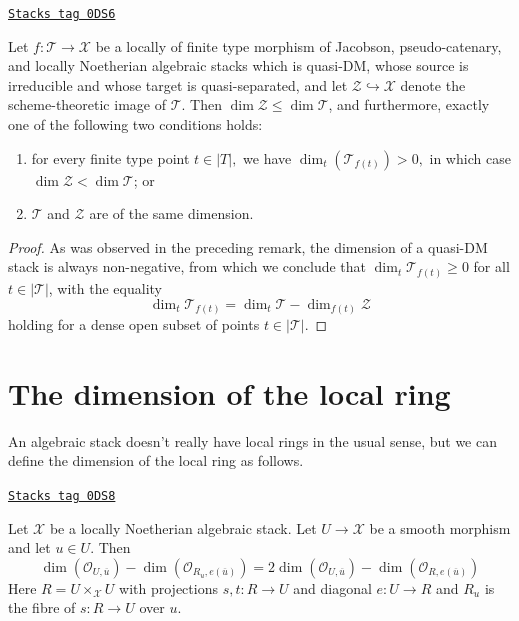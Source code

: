 \begin{lemma}
\label{stacks-geometry-lemma-dims-of-images-two}
\href{https://stacks.math.columbia.edu/tag/0DS6}{\texttt{Stacks tag 0DS6}}

Let $f: \mathcal{T} \to \mathcal{X}$ be a locally of finite type
morphism of Jacobson, pseudo-catenary, and locally Noetherian
algebraic stacks
which is quasi-DM,
whose source is irreducible and whose target is quasi-separated,
and let $\mathcal{Z} \hookrightarrow \mathcal{X}$ denote the scheme-theoretic
image of $\mathcal{T}$.
Then $\dim \mathcal{Z} \leq \dim \mathcal{T}$,
and furthermore, exactly one of the following two conditions holds:
\begin{enumerate}
\item for every finite type point $t \in |T|,$
we have
$\dim_t(\mathcal{T}_{f(t)}) > 0,$ in which
case $\dim \mathcal{Z} < \dim \mathcal{T}$; or
\item   $\mathcal{T}$ and $\mathcal{Z}$
are of the same dimension.
\end{enumerate}
\end{lemma}

\begin{proof}
As was observed in the preceding remark,
the dimension of a quasi-DM stack is always non-negative,
from which we conclude that $\dim_t \mathcal{T}_{f(t)} \geq 0$
for all $t \in |\mathcal{T}|$, with the equality
$$
\dim_t \mathcal{T}_{f(t)} = \dim_t \mathcal{T} - \dim_{f(t)} \mathcal{Z}
$$
holding
for a dense open subset of points $t\in |\mathcal{T}|$.
\end{proof}

\section{The dimension of the local ring}
\label{stacks-geometry-section-dimension-local-ring}
An algebraic stack doesn't really have local rings in the usual sense,
but we can define the dimension of the local ring as follows.

\begin{lemma}
\label{stacks-geometry-lemma-dimension-local-ring-pre}
\href{https://stacks.math.columbia.edu/tag/0DS8}{\texttt{Stacks tag 0DS8}}

Let $\mathcal{X}$ be a locally Noetherian algebraic stack.
Let $U \to \mathcal{X}$ be a smooth morphism and let $u \in U$.
Then
$$
\dim(\mathcal{O}_{U, \overline{u}}) -
\dim(\mathcal{O}_{R_u, e(\overline{u})}) =
2\dim(\mathcal{O}_{U, \overline{u}}) -
\dim(\mathcal{O}_{R, e(\overline{u})})
$$
Here $R = U \times_\mathcal{X} U$ with projections $s, t : R \to U$ and
diagonal $e : U \to R$ and $R_u$ is the fibre of $s : R \to U$ over $u$.
\end{lemma}


